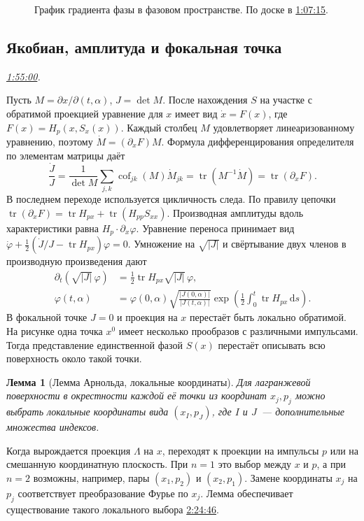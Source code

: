 \documentclass[11pt,a4paper]{article}
\theoremstyle{plain}
\newtheorem{lemma}[theorem]{Лемма}
\theoremstyle{definition}
\newcommand{\dd}{\,\mathrm d}
\newcommand{\abs}[1]{\lvert#1\rvert}
\DeclareMathOperator{\tr}{tr}
\newcommand{\at}[3]{\href{https://www.youtube.com/watch?v=#1&t=#2s}{#3}}
\newcommand{\topic}[2]{\Needspace{5\baselineskip}\subsection*{#1}\noindent\emph{#2.}\par\nobreak\smallskip}
\begin{document}
\begin{figure}[ht]
\centering
{}
\caption{График градиента фазы в фазовом пространстве.
По доске в \at{Ks_j6QaMPJ4}{4035}{1:07:15}.}
\end{figure}

\topic{Якобиан, амплитуда и фокальная точка}{\at{Ks_j6QaMPJ4}{6900}{1:55:00}}
Пусть $M=\partial x/\partial(t,\alpha)$, $J=\det M$.
После нахождения $S$ на участке с обратимой проекцией
уравнение для $x$ имеет вид $\dot x=F(x)$, где
$F(x)=H_p(x,S_x(x))$. Каждый столбец $M$
удовлетворяет линеаризованному уравнению, поэтому
$\dot M=(\partial_x F)M$. Формула дифференцирования
определителя по элементам матрицы даёт
\[
 \frac{\dot J}{J}=
 \frac{1}{\det M}\sum_{j,k}\operatorname{cof}_{jk}(M)\dot M_{jk}
 =\tr(M^{-1}\dot M)=\tr(\partial_xF).
\]
В последнем переходе используется цикличность следа.
По правилу цепочки
$\tr(\partial_xF)=\tr H_{px}+\tr(H_{pp}S_{xx})$.
Производная амплитуды вдоль характеристики равна
$H_p\cdot\partial_x\varphi$. Уравнение переноса принимает
вид $\dot\varphi+\tfrac12(\dot J/J-\tr H_{px})\varphi=0$.
Умножение на $\sqrt{|J|}$ и свёртывание двух членов
в производную произведения дают
\[
 \begin{aligned}
 \partial_t(\sqrt{\abs J}\,\varphi)
     &=\tfrac12\tr H_{px}\sqrt{\abs J}\,\varphi,\\
 \varphi(t,\alpha)&=\varphi(0,\alpha)
    \sqrt{\frac{\abs{J(0,\alpha)}}{\abs{J(t,\alpha)}}}
    \exp\!\left(\tfrac12\int_0^t\tr H_{px}\dd s\right).
 \end{aligned}
\]
В фокальной точке $J=0$ и проекция на $x$ перестаёт быть
локально обратимой. На рисунке одна точка $x^0$ имеет
несколько прообразов с различными импульсами. Тогда
представление единственной фазой $S(x)$ перестаёт описывать
всю поверхность около такой точки.
\begin{lemma}[Лемма Арнольда, локальные координаты]
Для лагранжевой поверхности в окрестности каждой её
точки из координат $x_j,p_j$ можно выбрать локальные
координаты вида $(x_I,p_J)$, где $I$ и $J$~---
дополнительные множества индексов.
\end{lemma}
Когда вырождается проекция $\Lambda$ на $x$, переходят к
проекции на импульсы $p$ или на смешанную координатную
плоскость. При $n=1$ это выбор между $x$ и $p$, а при
$n=2$ возможны, например, пары $(x_1,p_2)$ и $(x_2,p_1)$.
Замене координаты $x_j$ на $p_j$ соответствует
преобразование Фурье по $x_j$. Лемма обеспечивает
существование такого локального выбора
\at{Ks_j6QaMPJ4}{8686}{2:24:46}.
\end{document}
